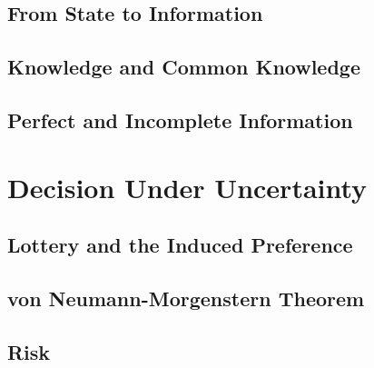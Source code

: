 \subsection{From State to Information}


\subsection{Knowledge and Common Knowledge}


\subsection{Perfect and Incomplete Information}
\label{sec: info}

\section{Decision Under Uncertainty}
\subsection{Lottery and the Induced Preference}

\subsection{von Neumann-Morgenstern Theorem}

\subsection{Risk}

